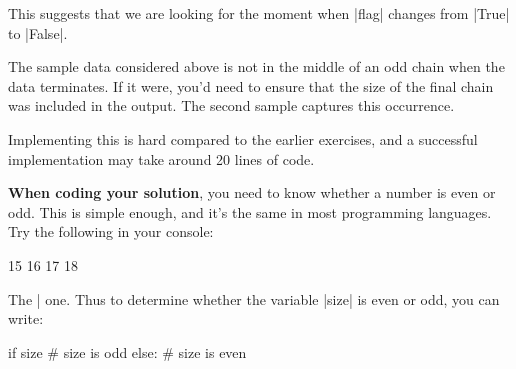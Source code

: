 This suggests that we are looking for the moment when \pycode|flag| changes from
\pycode|True| to \pycode|False|.

The sample data considered above is not in the middle of an odd chain when the data
terminates. If it were, you'd need to ensure that the size of the final chain was included
in the output. The second sample captures this occurrence.

Implementing this is hard compared to the earlier exercises, and a successful
implementation may take around 20 lines of code.

\bigskip
\textbf{When coding your solution}, you need to know whether a number is even or odd. This
is simple enough, and it's the same in most programming languages. Try the following in
your console:
\begin{pythoncode}
  15 %
  16 %
  17 %
  18 %
\end{pythoncode}

The \pycode|%
one. Thus to determine whether the variable \pycode|size| is even or odd, you can write:
\begin{pythoncode}
  if size %
    # size is odd
  else:
    # size is even
\end{pythoncode}

